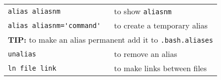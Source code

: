 \documentclass[a4paper,10pt,landscape]{article}
\begin{document}
\begin{multicols}{3}
\begin{tabular}{ll}
   \verb=alias aliasnm=           & to show \tt aliasnm \\
   \verb!alias aliasnm='command'! & to create a temporary alias \\
   \multicolumn{2}{l}{\textbf{TIP:} to make an alias permanent add it to \tt .bash.aliases} \\
   \verb!unalias!                 & to remove an alias \\
   \verb!ln file link!            & to make links between files \\
  \end{tabular}

\end{multicols}
\end{document}

